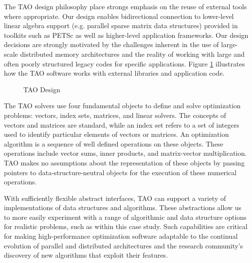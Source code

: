 
The TAO design philosophy place strongs emphasis on the reuse of
external tools where appropriate.  Our design enables bidirectional
connection to lower-level linear algebra support (e.g. parallel sparse
matrix data structures) provided in toolkits such as PETSc
\cite{petsc} \cite{petsc-user-ref,petsc-web-page}
as well as higher-level application
frameworks.  Our design decisions are strongly motivated by the
challenges inherent in the use of large-scale distributed memory
architectures and the reality of working with large and often poorly
structured legacy codes for specific applications.  Figure
\ref{tao:design} illustrates how the TAO software works with external
libraries and application code.


\begin{figure}
\centerline{\epsfysize=3.5in }
\caption{TAO Design}
\label{tao:design}
\end{figure}


The TAO solvers use four fundamental objects to define and solve
optimization problems: vectors, index sets, matrices, and linear
solvers.  The concepts of vectors and matrices are standard, while an
index set refers to a set of integers used to identify particular
elements of vectors or matrices.  An optimization algorithm is a
sequence of well defined operations on these objects.  These
operations include vector sums, inner products, and matrix-vector
multiplication.  TAO makes no assumptions about the representation of
these objects by passing pointers to data-structure-neutral objects
for the execution of these numerical operations.

With sufficiently flexible abstract interfaces, TAO can support a
variety of implementations of data structures and algorithms.  These
abstractions allow us to more easily experiment with a range of
algorithmic and data structure options for realistic problems, such as
within this case study.  Such capabilities are critical for making
high-performance optimization software adaptable to the continual
evolution of parallel and distributed architectures and the research
community's discovery of new algorithms that exploit their features.

